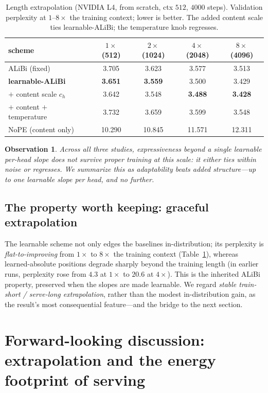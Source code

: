 \documentclass[11pt,a4paper]{article}
\newtheorem{observation}{Observation}
\begin{document}
\begin{table}[t]
\centering
\caption{Length extrapolation (NVIDIA L4, from scratch, ctx $512$, $4000$ steps).
Validation perplexity at $1$--$8\times$ the training context; lower is better.
The added content scale ties learnable-ALiBi; the temperature knob regresses.}
\label{tab:hetero}
\begin{tabular}{lcccc}
\toprule
scheme & $1\times$ (512) & $2\times$ (1024) & $4\times$ (2048) & $8\times$ (4096) \\
\midrule
ALiBi (fixed) & 3.705 & 3.623 & 3.577 & 3.513 \\
\textbf{learnable-ALiBi} & \textbf{3.651} & \textbf{3.559} & 3.500 & 3.429 \\
$+$ content scale $c_h$ & 3.642 & 3.548 & \textbf{3.488} & \textbf{3.428} \\
$+$ content $+$ temperature & 3.732 & 3.659 & 3.599 & 3.548 \\
NoPE (content only) & 10.290 & 10.845 & 11.571 & 12.311 \\
\bottomrule
\end{tabular}
\end{table}

\begin{observation}
Across all three studies, expressiveness beyond a single learnable per-head slope
does not survive proper training at this scale: it either ties within noise or
regresses. We summarize this as \emph{adaptability beats added structure---up to
one learnable slope per head, and no further}.
\end{observation}

\subsection{The property worth keeping: graceful extrapolation}
The learnable scheme not only edges the baselines in-distribution; its perplexity
is \emph{flat-to-improving} from $1\times$ to $8\times$ the training context
(Table~\ref{tab:hetero}), whereas learned-absolute positions degrade sharply
beyond the training length (in earlier runs, perplexity rose from $4.3$ at
$1\times$ to $20.6$ at $4\times$). This is the inherited ALiBi property,
preserved when the slopes are made learnable. We regard \emph{stable
train-short / serve-long extrapolation}, rather than the modest in-distribution
gain, as the result's most consequential feature---and the bridge to the next
section.

\section{Forward-looking discussion: extrapolation and the energy footprint of
serving}
\label{sec:energy}
\end{document}
